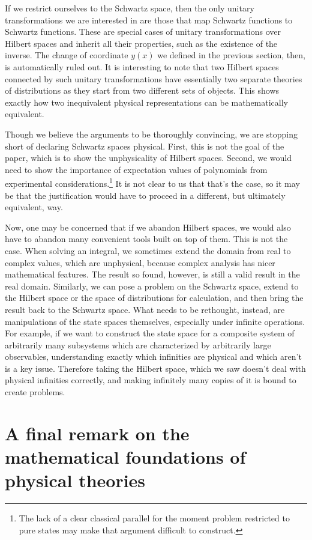 \documentclass[10pt,twocolumn, nofootinbib]{revtex4-2}
\begin{document}
If we restrict ourselves to the Schwartz space, then the only unitary transformations we are interested in are those that map Schwartz functions to Schwartz functions. These are special cases of unitary transformations over Hilbert spaces and inherit all their properties, such as the existence of the inverse. The change of coordinate $y(x)$ we defined in the previous section, then, is automatically ruled out. It is interesting to note that two Hilbert spaces connected by such unitary transformations have essentially two separate theories of distributions as they start from two different sets of objects. This shows exactly how two inequivalent physical representations can be mathematically equivalent.

Though we believe the arguments to be thoroughly convincing, we are stopping short of declaring Schwartz spaces physical. First, this is not the goal of the paper, which is to show the unphysicality of Hilbert spaces. Second, we would need to show the importance of expectation values of polynomials from experimental considerations.\footnote{The lack of a clear classical parallel for the moment problem restricted to pure states may make that argument difficult to construct.} It is not clear to us that that's the case, so it may be that the justification would have to proceed in a different, but ultimately equivalent, way.

Now, one may be concerned that if we abandon Hilbert spaces, we would also have to abandon many convenient tools built on top of them. This is not the case. When solving an integral, we sometimes extend the domain from real to complex values, which are unphysical, because complex analysis has nicer mathematical features. The result so found, however, is still a valid result in the real domain. Similarly, we can pose a problem on the Schwartz space, extend to the Hilbert space or the space of distributions for calculation, and then bring the result back to the Schwartz space. What needs to be rethought, instead, are manipulations of the state spaces themselves, especially under infinite operations. For example, if we want to construct the state space for a composite system of arbitrarily many subsystems which are characterized by arbitrarily large observables, understanding exactly which infinities are physical and which aren't is a key issue. Therefore taking the Hilbert space, which we saw doesn't deal with physical infinities correctly, and making infinitely many copies of it is bound to create problems.


\section{A final remark on the mathematical foundations of physical theories}
\end{document}
